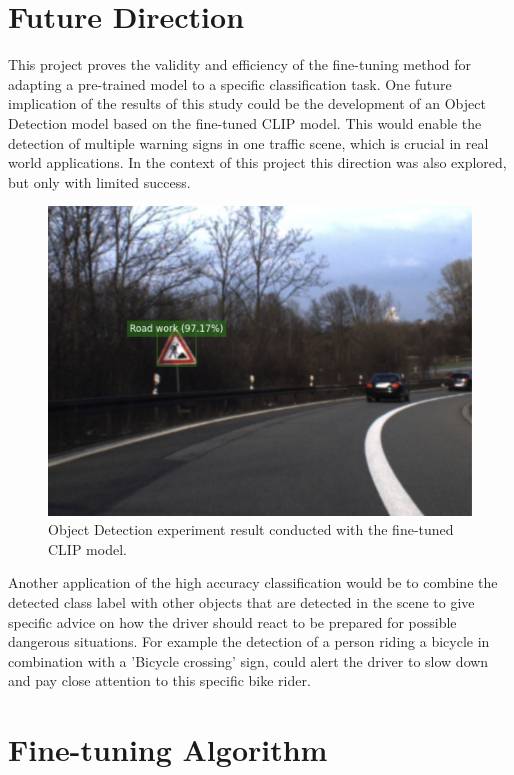 \documentclass{article}
\begin{document}
\FloatBarrier
\section{Future Direction}
This project proves the validity and efficiency of the fine-tuning method for adapting a pre-trained model to a specific classification task. One future implication of the results of this study could be the development of an Object Detection model based on the fine-tuned CLIP model. This would enable the detection of multiple warning signs in one traffic scene, which is crucial in real world applications. In the context of this project this direction was also explored, but only with limited success.
\begin{figure}[H]
    \centering
    \includegraphics[width=0.7\columnwidth]{images/detection_res.png}
    \caption{Object Detection experiment result conducted with the fine-tuned CLIP model.}
    \label{fig:detection_res}
\end{figure}
Another application of the high accuracy classification would be to combine the detected class label with other objects that are detected in the scene to give specific advice on how the driver should react to be prepared for possible dangerous situations. For example the detection of a person riding a bicycle in combination with a 'Bicycle crossing' sign, could alert the driver to slow down and pay close attention to this specific bike rider. 




\newpage
\appendix
\section{Fine-tuning Algorithm}
\end{document}
